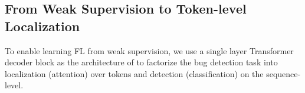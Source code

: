 
\subsection{From Weak Supervision to Token-level Localization}
To enable learning FL from weak supervision, we
use a single layer Transformer decoder block as the architecture of \ourmethod{} to 
factorize the bug detection task into localization (attention) over tokens and detection (classification) on the sequence-level.
